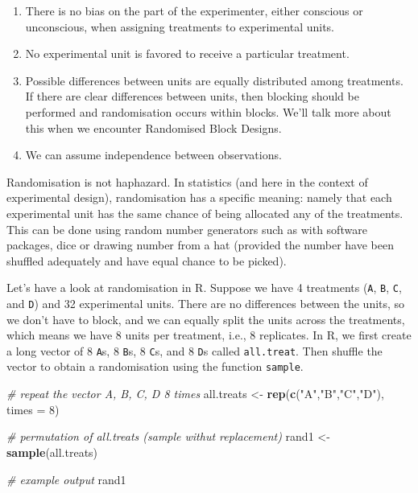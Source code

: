 \documentclass[
  letterpaper,
]{book}
\newenvironment{Shaded}{\begin{snugshade}}{\end{snugshade}}
\newcommand{\AttributeTok}[1]{\textcolor[rgb]{0.13,0.29,0.53}{#1}}
\newcommand{\CommentTok}[1]{\textcolor[rgb]{0.56,0.35,0.01}{\textit{#1}}}
\newcommand{\DecValTok}[1]{\textcolor[rgb]{0.00,0.00,0.81}{#1}}
\newcommand{\FunctionTok}[1]{\textcolor[rgb]{0.13,0.29,0.53}{\textbf{#1}}}
\newcommand{\NormalTok}[1]{#1}
\newcommand{\OtherTok}[1]{\textcolor[rgb]{0.56,0.35,0.01}{#1}}
\newcommand{\StringTok}[1]{\textcolor[rgb]{0.31,0.60,0.02}{#1}}
\begin{document}
\begin{enumerate}
\def\labelenumi{\arabic{enumi}.}
\item
  There is no bias on the part of the experimenter, either conscious or
  unconscious, when assigning treatments to experimental units.
\item
  No experimental unit is favored to receive a particular treatment.
\item
  Possible differences between units are equally distributed among
  treatments. If there are clear differences between units, then
  blocking should be performed and randomisation occurs within blocks.
  We'll talk more about this when we encounter Randomised Block Designs.
\item
  We can assume independence between observations.
\end{enumerate}

Randomisation is not haphazard. In statistics (and here in the context
of experimental design), randomisation has a specific meaning: namely
that each experimental unit has the same chance of being allocated any
of the treatments. This can be done using random number generators such
as with software packages, dice or drawing number from a hat (provided
the number have been shuffled adequately and have equal chance to be
picked).

Let's have a look at randomisation in R. Suppose we have 4 treatments
(\texttt{A}, \texttt{B}, \texttt{C}, and \texttt{D}) and 32 experimental
units. There are no differences between the units, so we don't have to
block, and we can equally split the units across the treatments, which
means we have 8 units per treatment, i.e., 8 replicates. In R, we first
create a long vector of 8 \texttt{A}s, 8 \texttt{B}s, 8 \texttt{C}s, and
8 \texttt{D}s called \texttt{all.treat}. Then shuffle the vector to
obtain a randomisation using the function \texttt{sample}.

\begin{Shaded}
\begin{Highlighting}[]
\CommentTok{\# repeat the vector A, B, C, D 8 times }
\NormalTok{all.treats }\OtherTok{\textless{}{-}} \FunctionTok{rep}\NormalTok{(}\FunctionTok{c}\NormalTok{(}\StringTok{"A"}\NormalTok{,}\StringTok{"B"}\NormalTok{,}\StringTok{"C"}\NormalTok{,}\StringTok{"D"}\NormalTok{), }\AttributeTok{times =} \DecValTok{8}\NormalTok{)}

\CommentTok{\# permutation of all.treats (sample withut replacement)}
\NormalTok{rand1 }\OtherTok{\textless{}{-}} \FunctionTok{sample}\NormalTok{(all.treats)}

\CommentTok{\# example output}
\NormalTok{rand1}
\end{Highlighting}
\end{Shaded}
\end{document}
